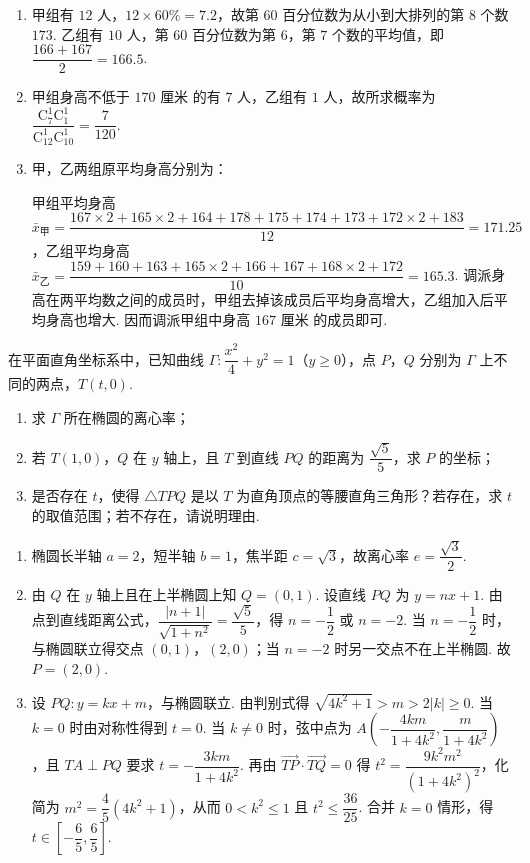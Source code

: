 \begin{solution}
\begin{enumerate}
\item 甲组有 \(12\) 人，\(12\times60\%=7.2\)，故第 \(60\) 百分位数为从小到大排列的第 \(8\) 个数 \(173\). 乙组有 \(10\) 人，第 \(60\) 百分位数为第 \(6\)，第 \(7\) 个数的平均值，即 \(\dfrac{166+167}{2}=166.5\).
\item 甲组身高不低于 \(170\text{ 厘米}\) 的有 \(7\) 人，乙组有 \(1\) 人，故所求概率为 \(\dfrac{\mathrm C_7^1\mathrm C_1^1}{\mathrm C_{12}^1\mathrm C_{10}^1}=\dfrac7{120}\).
\item 甲，乙两组原平均身高分别为：

甲组平均身高 \(\bar x_{\text{甲}}=\dfrac{167\times2+165\times2+164+178+175+174+173+172\times2+183}{12}=171.25\)，乙组平均身高 \(\bar x_{\text{乙}}=\dfrac{159+160+163+165\times2+166+167+168\times2+172}{10}=165.3\). 调派身高在两平均数之间的成员时，甲组去掉该成员后平均身高增大，乙组加入后平均身高也增大. 因而调派甲组中身高 \(167\text{ 厘米}\) 的成员即可.
\end{enumerate}
\end{solution}

\begin{problem}
在平面直角坐标系中，已知曲线 \(\Gamma:\dfrac{x^2}{4}+y^2=1\)（\(y\ge0\)），点 \(P\)，\(Q\) 分别为 \(\Gamma\) 上不同的两点，\(T(t,0)\).
\begin{enumerate}
\item 求 \(\Gamma\) 所在椭圆的离心率；
\item 若 \(T(1,0)\)，\(Q\) 在 \(y\) 轴上，且 \(T\) 到直线 \(PQ\) 的距离为 \(\dfrac{\sqrt5}{5}\)，求 \(P\) 的坐标；
\item 是否存在 \(t\)，使得 \(\triangle TPQ\) 是以 \(T\) 为直角顶点的等腰直角三角形？若存在，求 \(t\) 的取值范围；若不存在，请说明理由.
\end{enumerate}

\end{problem}

\begin{solution}
\begin{enumerate}
\item 椭圆长半轴 \(a=2\)，短半轴 \(b=1\)，焦半距 \(c=\sqrt3\)，故离心率 \(e=\dfrac{\sqrt3}{2}\).
\item 由 \(Q\) 在 \(y\) 轴上且在上半椭圆上知 \(Q=(0,1)\). 设直线 \(PQ\) 为 \(y=nx+1\). 由点到直线距离公式，\(\dfrac{|n+1|}{\sqrt{1+n^2}}=\dfrac{\sqrt5}{5}\)，得 \(n=-\dfrac12\) 或 \(n=-2\). 当 \(n=-\dfrac12\) 时，与椭圆联立得交点 \((0,1)\)，\((2,0)\)；当 \(n=-2\) 时另一交点不在上半椭圆. 故 \(P=(2,0)\).
\item 设 \(PQ:y=kx+m\)，与椭圆联立. 由判别式得 \(\sqrt{4k^2+1}>m>2|k|\ge0\). 当 \(k=0\) 时由对称性得到 \(t=0\). 当 \(k\ne0\) 时，弦中点为 \(A\left(-\dfrac{4km}{1+4k^2},\dfrac{m}{1+4k^2}\right)\)，且 \(TA\perp PQ\) 要求 \(t=-\dfrac{3km}{1+4k^2}\). 再由 \(\overrightarrow{TP}\cdot\overrightarrow{TQ}=0\) 得 \(t^2=\dfrac{9k^2m^2}{(1+4k^2)^2}\)，化简为 \(m^2=\dfrac45(4k^2+1)\)，从而 \(0<k^2\le1\) 且 \(t^2\le\dfrac{36}{25}\). 合并 \(k=0\) 情形，得 \(t\in\left[-\dfrac65,\dfrac65\right]\).
\end{enumerate}
\end{solution}

